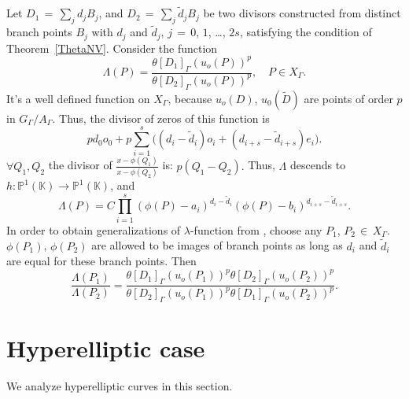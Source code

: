 \documentclass[]{amsart}
\numberwithin{equation}{section}
\begin{document}
 Let $D_1\,{=}\,\sum_{j}d_{j} B_j$, and
 $D_2\,{=}\,\sum_{j} \tilde{d}_{j} B_j$ be two divisors constructed from
 distinct branch points $B_j$ with $d_{j}$ and $\tilde{d}_j$, $j\,{=}\,0$, $1$, \ldots, $2s$, 
 satisfying the condition of Theorem~\ref{ThetaNV}.  
Consider the function  
$$\Lambda(P) = \frac{ \theta[D_1]_{\Gamma}(u_o(P))^p}
{ \theta[D_2]_{\Gamma}(u_o(P))^p},\quad P \in X_{\Gamma}.$$
It's a well defined function on $X_{\Gamma}$, because $u_o(D)$, $u_0(\tilde{D})$ 
are points of order $p$ in $G_{\Gamma}/A_{\Gamma}$. 
Thus, the divisor of zeros of this function is
$$p d_0 o_0 + p \sum_{i=1}^{s} \big( (d_{i} - \tilde{d}_i) o_i + (d_{i+s} - \tilde{d}_{i+s}) e_i \big). $$ 
$\forall Q_1,Q_2$ the divisor of  $\frac{x-\phi(Q_1)}{x-\phi(Q_2)}$ is: $p(Q_1-Q_2).$ 
Thus, $\Lambda$ descends to $h:\mathbb{P}^1(\mathbb{K}) \to \mathbb{P}^{1}(\mathbb{K})$, and  
$$\Lambda(P)=C\prod_{i=1}^s (\phi(P)-a_i)^{d_{i}- \tilde{d}_{i}} (\phi(P)-b_i)^{d_{i+s}- \tilde{d}_{i+s}}.$$
In order to obtain generalizations of  $\lambda$-function from \cite{T}, choose any $P_1$, $P_2\,{\in}\, X_{\Gamma}$. 
$\phi(P_1)$, $\phi(P_2)$  are allowed to be images of branch points 
 as long as $d_{i}$ and $\tilde{d}_{i}$ are equal for these branch points. 
Then
\begin{equation}
\frac{\Lambda(P_1)}{\Lambda(P_2)}
= \frac{ \theta[D_1]_{\Gamma}(u_o(P_1))^p \theta[D_2]_{\Gamma}(u_o(P_2))^p}
{ \theta[D_2]_{\Gamma}(u_o(P_1))^p \theta[D_1]_{\Gamma}(u_o(P_2))^p}.
\end{equation}

\section{Hyperelliptic case}
We analyze hyperelliptic curves in this section.
\end{document}
